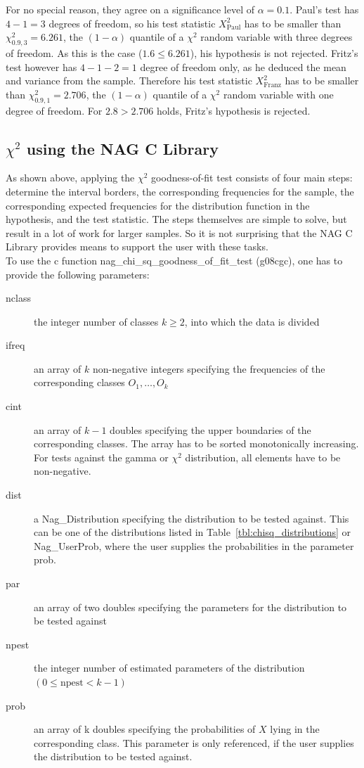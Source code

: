 \documentclass{article}
\theoremstyle{definition}
\newcommand{\reftbl}[1]{Table~\ref{#1}}
\begin{document}
%
For no special reason, they agree on a significance level of $\alpha = 0.1$.
Paul's test has $4-1=3$ degrees of freedom, so his test statistic $X^2_{\text{Paul}}$ has to be smaller than $\chi^2_{0.9, 3} = 6.261$, the $(1-\alpha)$ quantile of a $\chi^2$ random variable with three degrees of freedom.
As this is the case ($1.6 \leq 6.261$), his hypothesis is not rejected.
Fritz's test however has $4-1-2=1$ degree of freedom only, as he deduced the mean and variance from the sample.
Therefore his test statistic $X^2_{\text{Franz}}$ has to be smaller than $\chi^2_{0.9, 1} = 2.706$, the $(1-\alpha)$ quantile of a $\chi^2$ random variable with one degree of freedom.
For $2.8 > 2.706$ holds, Fritz's hypothesis is rejected.

\subsection{$\chi^2$ using the NAG C Library}
As shown above, applying the $\chi^2$ goodness-of-fit test consists of four main steps: determine the interval borders, the corresponding frequencies for the sample, the corresponding expected frequencies for the distribution function in the hypothesis, and the test statistic.
The steps themselves are simple to solve, but result in a lot of work for larger samples.
So it is not surprising that the NAG C Library provides means to support the user with these tasks.
\\
To use the c function nag\_chi\_sq\_goodness\_of\_fit\_test (g08cgc), one has to provide the following parameters:
\begin{description}
	\item[nclass] the integer number of classes $k\geq 2$, into which the data is divided
	\item[ifreq] an array of $k$ non-negative integers specifying the frequencies of the corresponding classes $O_{1}, \ldots, O_{k}$
	\item[cint] an array of $k-1$ doubles specifying the upper boundaries of the corresponding classes.
		The array has to be sorted monotonically increasing.
		For tests against the gamma or $\chi^2$ distribution, all elements have to be non-negative.
	\item[dist] a Nag\_Distribution specifying the distribution to be tested against. This can be one of the distributions listed in \reftbl{tbl:chisq_distributions} or Nag\_UserProb, where the user supplies the probabilities in the parameter prob.
	\item[par] an array of two doubles specifying the parameters for the distribution to be tested against
	\item[npest] the integer number of estimated parameters of the distribution $(0\leq\text{npest}<k-1)$
	\item[prob] an array of k doubles specifying the probabilities of $X$ lying in the corresponding class.
		This parameter is only referenced, if the user supplies the distribution to be tested against.
\end{description}
\end{document}
